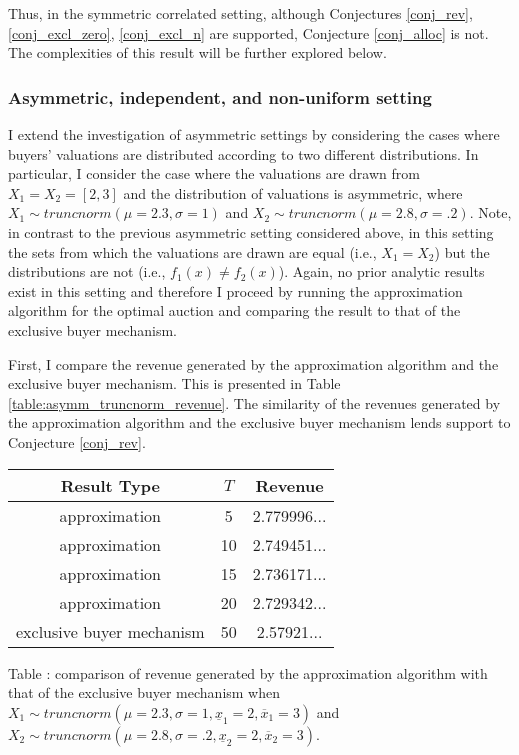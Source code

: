 Thus, in the symmetric correlated setting, although Conjectures \ref{conj_rev}, \ref{conj_excl_zero}, \ref{conj_excl_n} are supported, Conjecture \ref{conj_alloc} is not. The complexities of this result will be further explored below.







\subsubsection{Asymmetric, independent, and non-uniform setting}

I extend the investigation of asymmetric settings by considering the cases where buyers' valuations are distributed according to two different distributions. In particular, I consider the case where the valuations are drawn from $X_1 = X_2 = [2,3]$ and the distribution of valuations is asymmetric, where $X_1 \sim truncnorm(\mu=2.3, \sigma=1)$ and $X_2 \sim truncnorm(\mu=2.8, \sigma=.2)$. Note, in contrast to the previous asymmetric setting considered above, in this setting the sets from which the valuations are drawn are equal (i.e., $X_1 = X_2$) but the distributions are not (i.e., $f_1(x) \neq f_2(x)$). Again, no prior analytic results exist in this setting and therefore I proceed by running the approximation algorithm for the optimal auction and comparing the result to that of the exclusive buyer mechanism.

First, I compare the revenue generated by the approximation algorithm and the exclusive buyer mechanism. This is presented in Table \ref{table:asymm_truncnorm_revenue}. The similarity of the revenues generated by the approximation algorithm and the exclusive buyer mechanism lends support to Conjecture \ref{conj_rev}.

\begin{center}
    \begin{tabular}{ |c|c|c| } 
    \hline
    Result Type & $T$ & Revenue \\
    \hline
    \hline
    approximation & 5 & 2.779996... \\ 
    approximation & 10 & 2.749451... \\ 
    approximation & 15 & 2.736171... \\ 
    approximation & 20 & 2.729342... \\ 
    exclusive buyer mechanism & 50 & 2.57921... \\
    \hline
    \end{tabular}

    \vspace{1mm}
    \raggedright{\small {\sc Table \thefig\label{table:asymm_truncnorm_revenue}:} comparison of revenue generated by the approximation algorithm with that of the exclusive buyer mechanism when $X_1 \sim truncnorm(\mu=2.3, \sigma=1, \underline{x}_1=2, \overline{x}_1=3)$ and $X_2 \sim truncnorm(\mu=2.8, \sigma=.2, \underline{x}_2=2, \overline{x}_2=3)$.}
\end{center}

